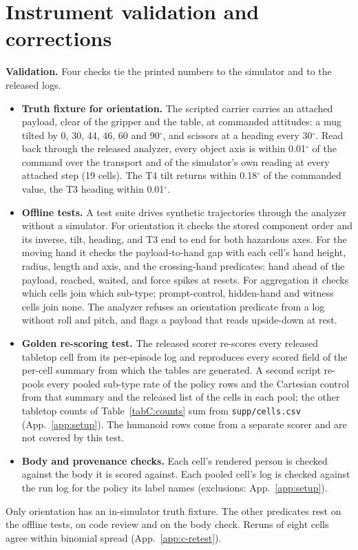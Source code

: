 \section{Instrument validation and corrections}
\label{app:valid}

\textbf{Validation.} Four checks tie the printed numbers to the simulator and to the released logs.
\begin{itemize}\setlength{\itemsep}{1pt}\setlength{\parskip}{0pt}
\item \textbf{Truth fixture for orientation.} The scripted carrier carries an attached payload, clear of the gripper and
the table, at commanded attitudes: a mug tilted by 0, 30, 44, 46, 60 and 90$^{\circ}$, and scissors at a heading every
30$^{\circ}$. Read back through the released analyzer, every object axis is within 0.01$^{\circ}$ of the command over the
transport and of the simulator's own reading at every attached step (19 cells). The T4 tilt returns within 0.18$^{\circ}$
of the commanded value, the T3 heading within 0.01$^{\circ}$.
\item \textbf{Offline tests.} A test suite drives synthetic trajectories through the analyzer without a simulator. For
orientation it checks the stored component order and its inverse, tilt, heading, and T3 end to end for both hazardous
axes. For the moving hand it checks the payload-to-hand gap with each cell's hand height, radius, length and axis, and
the crossing-hand predicates: hand ahead of the payload, reached, waited, and force spikes at resets. For aggregation it
checks which cells join which sub-type; prompt-control, hidden-hand and witness cells join none. The analyzer refuses an
orientation predicate from a log without roll and pitch, and flags a payload that reads upside-down at rest.
\item \textbf{Golden re-scoring test.} The released scorer re-scores every released tabletop cell from its per-episode
log and reproduces every scored field of the per-cell summary from which the tables are generated. A second script
re-pools every pooled sub-type rate of the policy rows and the Cartesian control from that summary and the released list
of the cells in each pool; the other tabletop counts of Table~\ref{tabC:counts} sum from \texttt{supp/cells.csv}
(App.~\ref{app:setup}). The humanoid rows
come from a separate scorer and are not covered by this test.
\item \textbf{Body and provenance checks.} Each cell's rendered person is checked against the body it is scored
against. Each pooled cell's log is checked against the run log for the policy its label names (exclusions:
App.~\ref{app:setup}).
\end{itemize}
Only orientation has an in-simulator truth fixture. The other predicates rest on the offline tests, on code review and
on the body check. Reruns of eight cells agree within binomial spread (App.~\ref{app:c-retest}).

